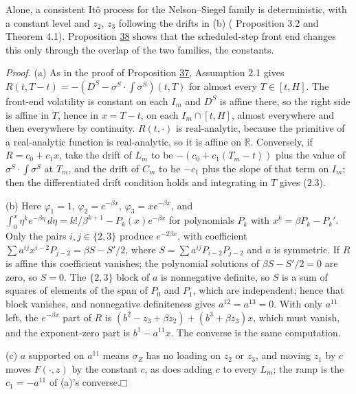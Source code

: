 \documentclass[11pt]{article}
\providecommand{\square}{\mdlgwhtsquare}
\begin{document}
Alone, a consistent Itô process for the Nelson--Siegel family is deterministic, with a constant level and \(z_2\), \(z_3\) following the drifts in (b) (\cite{filipovic1999note} Proposition 3.2 and Theorem 4.1). Proposition \hyperref[res:Proposition-38]{38} shows that the scheduled-step front end changes this only through the overlap of the two families, the constants.

\emph{Proof.} (a) As in the proof of Proposition \hyperref[res:Proposition-37]{37}, Assumption 2.1 gives \(R(t,T-t)=-(D^S-\sigma^S\cdot\int\sigma^S)(t,T)\) for almost every \(T\in[t,H]\). The front-end volatility is constant on each \(I_m\) and \(D^S\) is affine there, so the right side is affine in \(T\), hence in \(x=T-t\), on each \(I_m\cap[t,H]\), almost everywhere and then everywhere by continuity. \(R(t,\cdot)\) is real-analytic, because the primitive of a real-analytic function is real-analytic, so it is affine on \(\mathbb R\). Conversely, if \(R=c_0+c_1x\), take the drift of \(L_m\) to be \(-(c_0+c_1(T_m-t))\) plus the value of \(\sigma^S\cdot\int\sigma^S\) at \(T_m\), and the drift of \(C_m\) to be \(-c_1\) plus the slope of that term on \(I_m\); then the differentiated drift condition holds and integrating in \(T\) gives (2.3).

(b) Here \(\varphi_1=1\), \(\varphi_2=e^{-\beta x}\), \(\varphi_3=xe^{-\beta x}\), and \(\int_0^x\eta^ke^{-\beta\eta}\,d\eta=k!/\beta^{k+1}-P_k(x)e^{-\beta x}\) for polynomials \(P_k\) with \(x^k=\beta P_k-P_k'\). Only the pairs \(i,j\in\{2,3\}\) produce \(e^{-2\beta x}\), with coefficient \(\sum a^{ij}x^{i-2}P_{j-2}=\beta S-S'/2\), where \(S=\sum a^{ij}P_{i-2}P_{j-2}\) and \(a\) is symmetric. If \(R\) is affine this coefficient vanishes; the polynomial solutions of \(\beta S-S'/2=0\) are zero, so \(S=0\). The \(\{2,3\}\) block of \(a\) is nonnegative definite, so \(S\) is a sum of squares of elements of the span of \(P_0\) and \(P_1\), which are independent; hence that block vanishes, and nonnegative definiteness gives \(a^{12}=a^{13}=0\). With only \(a^{11}\) left, the \(e^{-\beta x}\) part of \(R\) is \((b^2-z_3+\beta z_2)+(b^3+\beta z_3)x\), which must vanish, and the exponent-zero part is \(b^1-a^{11}x\). The converse is the same computation.

(c) \(a\) supported on \(a^{11}\) means \(\sigma_Z\) has no loading on \(z_2\) or \(z_3\), and moving \(z_1\) by \(c\) moves \(F(\cdot,z)\) by the constant \(c\), as does adding \(c\) to every \(L_m\); the ramp is the \(c_1=-a^{11}\) of (a)'s converse.\hfill$\square$
\end{document}
